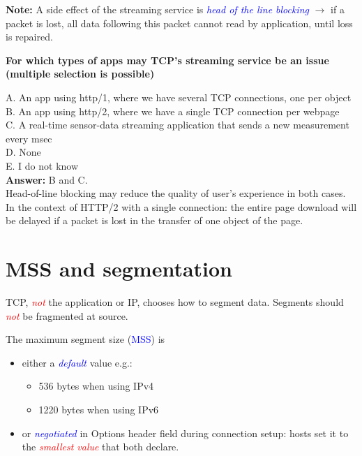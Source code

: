 \documentclass[11pt]{article}
\begin{document}
\textbf{Note:} A side effect of the streaming service is \textit{\textcolor{blue}{head of the line blocking}} $\rightarrow$ if a packet is lost, all data following this packet cannot read by application, until loss is repaired. 
\begin{tcolorbox}[
  colback=gray!15,     %
  colframe=black!50,    %
  boxrule=1pt,       %
  arc=3mm,             %
  left=4mm, right=4mm, top=2mm, bottom=2mm %
]
\textbf{For which types of apps may TCP's streaming service be an issue (multiple selection is possible)}

\vspace{0.3cm}

A. An app using http/1, where we have several TCP connections, one per object \\
B. An app using http/2, where we have a single TCP connection per webpage \\
C. A real-time sensor-data streaming application that sends a new measurement every msec \\
D. None \\ 
E. I do not know \\

\textbf{Answer:} B and C. \\
Head-of-line blocking may reduce the quality of user's experience in both cases. In the context of HTTP/2 with a single connection: the entire page download will be delayed if a packet is lost in the transfer of one object of the page. 
\end{tcolorbox}

\section*{MSS and segmentation}

TCP, \textit{\textcolor{red}{not}} the application or IP, chooses how to segment data. Segments should \textit{\textcolor{red}{not}} be fragmented at source. 

The maximum segment size (\textcolor{blue}{MSS}) is
\begin{itemize}
	\item either a \textcolor{blue}{\textit{default}} value e.g.:
		\begin{itemize}
			\item 536 bytes when using IPv4
			\item 1220 bytes when using IPv6
		\end{itemize}
	\item or \textit{\textcolor{blue}{negotiated}} in Options header field during connection setup: hosts set it to the \textit{\textcolor{red}{smallest value}} that both declare.
\end{itemize}
\end{document}
